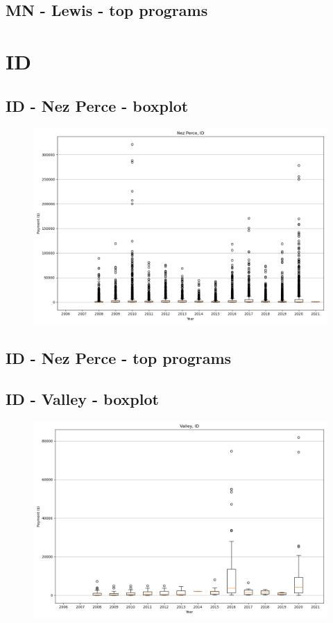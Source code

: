 \subsection*{MN - Lewis - top programs}

\newpage
\section*{ID}
\subsection*{ID - Nez Perce - boxplot}
\begin{figure}[h]
\centering
\includegraphics[width=7in]{../output/boxplots/counties/Nez Perce-ID_boxplot.png}
\end{figure}


\subsection*{ID - Nez Perce - top programs}

\newpage
\subsection*{ID - Valley - boxplot}
\begin{figure}[h]
\centering
\includegraphics[width=7in]{../output/boxplots/counties/Valley-ID_boxplot.png}
\end{figure}


